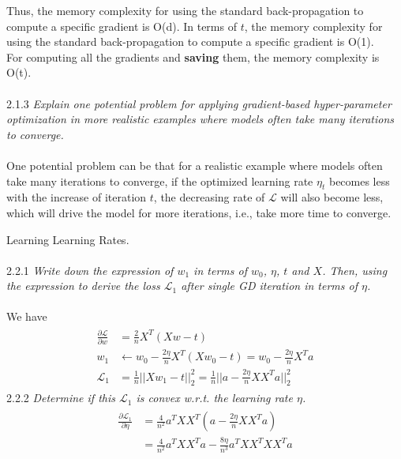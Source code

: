 \documentclass{myhw}
\begin{document}
\begin{homeworkProblem}
\begin{homeworkSection}
Thus, the memory complexity for using the standard back-propagation to compute a specific gradient is O(d). In terms of $t$, the memory complexity for using the standard back-propagation to compute a specific gradient is O(1). \\For computing all the gradients and \textbf{saving} them, the memory complexity is O(t).
\\ \\
2.1.3 \emph{Explain one potential problem for applying gradient-based hyper-parameter optimization in more realistic examples where models often take many iterations to converge.} \\ \\
One potential problem can be that for a realistic example where models often take many iterations to converge, if the optimized learning rate $\eta_t$ becomes less with the increase of iteration $t$, the decreasing rate of $\mathcal{L}$ will also become less, which will drive the model for more iterations, i.e., take more time to converge. 
\end{homeworkSection}
\begin{homeworkSection}
Learning Learning Rates. \\ \\
2.2.1 \emph{Write down the expression of $w_1$ in terms of $w_0$, $\eta$, $t$ and $X$. Then, using the expression to derive the loss $\mathcal{L}_1$ after single GD iteration in terms of $\eta$.} \\ \\
We have
\begin{gather*}
\begin{aligned}
\frac{\partial \mathcal{L}}{\partial w} &= \frac{2}{n} X^T(X w - t) \\
w_1 &\leftarrow w_0 - \frac{2 \eta}{n} X^T (X w_0 - t) = w_0 - \frac{2 \eta}{n} X^T a \\
\mathcal{L}_1 &= \frac{1}{n} ||X w_1 - t||_2^2 = \frac{1}{n} ||a - \frac{2 \eta}{n} X X^T a||_2^2
\end{aligned}
\end{gather*}
2.2.2 \emph{Determine if this $\mathcal{L}_1$ is convex w.r.t. the learning rate $\eta$.} 
\begin{gather*}
\begin{aligned}
\frac{\partial \mathcal{L}_1}{\partial \eta} &= \frac{4}{n^2} a^T XX^T (a-\frac{2\eta}{n}XX^Ta) \\
&= \frac{4}{n^2} a^T XX^T a - \frac{8\eta}{n^3} a^T XX^T XX^Ta\\

\end{aligned}
\end{gather*}
\end{homeworkSection}
\end{homeworkProblem}
\end{document}
